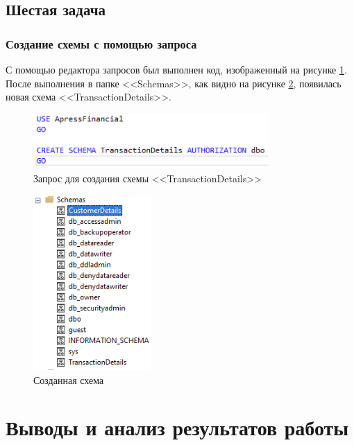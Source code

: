 \documentclass[a4paper, 14pt]{extarticle}
\begin{document}
\subsection{Шестая задача}

\subsubsection{Создание схемы с помощью запроса}

С помощью редактора запросов был выполнен код, изображенный на рисунке
\ref{fig:task-6/step-1.png}. После выполнения в папке <<Schemas>>, как видно на
рисунке \ref{fig:task-6/step-2.png}, появилась новая схема
<<TransactionDetails>>.

\begin{figure}[H]
  \centering
  \includegraphics[width=0.8\textwidth]{images/task-6/step-1.png}
  \caption{Запрос для создания схемы <<TransactionDetails>>}
  \label{fig:task-6/step-1.png}
\end{figure}

\begin{figure}[H]
  \centering
  \includegraphics[width=0.4\textwidth]{images/task-6/step-2.png}
  \caption{Созданная схема}
  \label{fig:task-6/step-2.png}
\end{figure}

\section{Выводы и анализ результатов работы}
\end{document}
